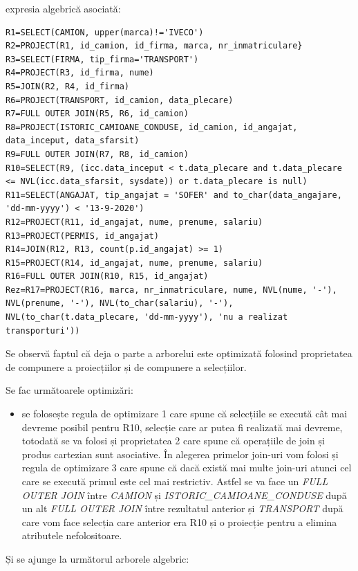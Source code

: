 \documentclass[12pt, a4paper]{article}
\begin{document}
\newpage{} expresia algebrică asociată:

\begin{lstlisting}
R1=SELECT(CAMION, upper(marca)!='IVECO')
R2=PROJECT(R1, id_camion, id_firma, marca, nr_inmatriculare}
R3=SELECT(FIRMA, tip_firma='TRANSPORT')
R4=PROJECT(R3, id_firma, nume)
R5=JOIN(R2, R4, id_firma)
R6=PROJECT(TRANSPORT, id_camion, data_plecare)
R7=FULL OUTER JOIN(R5, R6, id_camion)
R8=PROJECT(ISTORIC_CAMIOANE_CONDUSE, id_camion, id_angajat, data_inceput, data_sfarsit)
R9=FULL OUTER JOIN(R7, R8, id_camion)
R10=SELECT(R9, (icc.data_inceput < t.data_plecare and t.data_plecare <= NVL(icc.data_sfarsit, sysdate)) or t.data_plecare is null)
R11=SELECT(ANGAJAT, tip_angajat = 'SOFER' and to_char(data_angajare, 'dd-mm-yyyy') < '13-9-2020')
R12=PROJECT(R11, id_angajat, nume, prenume, salariu)
R13=PROJECT(PERMIS, id_angajat)
R14=JOIN(R12, R13, count(p.id_angajat) >= 1)
R15=PROJECT(R14, id_angajat, nume, prenume, salariu)
R16=FULL OUTER JOIN(R10, R15, id_angajat)
Rez=R17=PROJECT(R16, marca, nr_inmatriculare, nume, NVL(nume, '-'), NVL(prenume, '-'), NVL(to_char(salariu), '-'), NVL(to_char(t.data_plecare, 'dd-mm-yyyy'), 'nu a realizat transporturi'))
\end{lstlisting}

Se observă faptul că deja o parte a arborelui este optimizată folosind proprietatea de compunere a proiecțiilor și de compunere a selecțiilor.

Se fac următoarele optimizări:

\begin{itemize}
    \item se folosește regula de optimizare 1 care spune că selecțiile se execută cât mai devreme posibil pentru R10, selecție care ar putea fi realizată mai devreme, totodată se va folosi și proprietatea 2 care spune că operațiile de join și produs cartezian sunt asociative. În alegerea primelor join-uri vom folosi și regula de optimizare 3 care spune că dacă există mai multe join-uri atunci cel care se execută primul este cel mai restrictiv. Astfel se va face un \emph{FULL OUTER JOIN} între \emph{CAMION} și \emph{ISTORIC\_CAMIOANE\_CONDUSE} după un alt \emph{FULL OUTER JOIN} între rezultatul anterior și \emph{TRANSPORT} după care vom face selecția care anterior era R10 și o proiecție pentru a elimina atributele nefolositoare.
\end{itemize}

\newpage
Și se ajunge la următorul arborele algebric:
\end{document}

